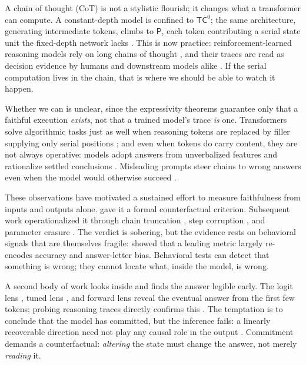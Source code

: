 \documentclass[11pt]{article}
\begin{document}
A chain of thought (CoT) is not a stylistic flourish; it changes what a transformer
can compute. A constant-depth model is confined to $\mathsf{TC}^0$; the same
architecture, generating intermediate tokens, climbs to $\mathsf{P}$, each
token contributing a serial state unit the fixed-depth network lacks
\citep{DBLP:conf/iclr/MerrillS24,DBLP:conf/nips/FengZGY0W23,DBLP:journals/corr/abs-2112-00114}.
This is now practice: reinforcement-learned reasoning models rely on long chains
of thought \citep{DBLP:journals/nature/GuoYZSWZXZMBZY025}, and their traces are
read as decision evidence by humans and downstream models alike
\citep{DBLP:journals/corr/abs-2507-11473}. If the serial computation lives in
the chain, that is where we should be able to watch it happen.

Whether we can is unclear, since the expressivity theorems guarantee only that a
faithful execution \emph{exists}, not that a trained model's trace \emph{is}
one. Transformers solve algorithmic tasks just as well when reasoning tokens are
replaced by filler supplying only serial positions
\citep{DBLP:journals/corr/abs-2404-15758,DBLP:conf/iclr/GoyalJRMKN24}; and even
when tokens do carry content, they are not always operative: models adopt
answers from unverbalized features \citep{DBLP:journals/corr/abs-2503-08679} and rationalize
settled conclusions \citep{DBLP:journals/corr/abs-2505-05410}. Misleading
prompts steer chains to wrong answers even when the model would otherwise
succeed \citep{DBLP:conf/nips/TurpinMPB23}.

These observations have motivated a sustained effort to measure faithfulness
from inputs and outputs alone.
\citet{DBLP:conf/acl/JacoviG20} gave it a formal counterfactual criterion.
Subsequent work operationalized it through chain truncation
\citep{DBLP:journals/corr/abs-2307-13702}, step corruption
\citep{DBLP:journals/corr/abs-2602-11201}, and parameter erasure
\citep{DBLP:conf/emnlp/TutekCMB25}. The verdict is sobering, but the evidence
rests on behavioral signals that are themselves fragile:
\citet{DBLP:journals/tmlr/BenthamSM24} showed that a leading metric largely
re-encodes accuracy and answer-letter bias. Behavioral tests can detect that
something is wrong; they cannot locate what, inside the model, is wrong.

A second body of work looks inside and finds the answer legible early. The logit
lens \citep{nostalgebraist2020logitlens}, tuned lens
\citep{DBLP:journals/corr/abs-2303-08112}, and forward lens
\citep{DBLP:conf/conll/PalSYWB23} reveal the eventual answer from the first few
tokens; probing reasoning traces directly confirms this
\citep{DBLP:journals/corr/abs-2603-05488,
DBLP:journals/corr/abs-2603-01437,DBLP:journals/corr/abs-2511-14773,
DBLP:journals/corr/abs-2604-06613}. The temptation is to conclude that the model
has committed, but the inference fails: a linearly recoverable direction need
not play any causal role in the output
\citep{DBLP:conf/nips/VigGBQNSS20,DBLP:conf/nips/GeigerLIP21}. Commitment
demands a counterfactual: \emph{altering} the state must change the answer, not
merely \emph{reading} it.
\end{document}
